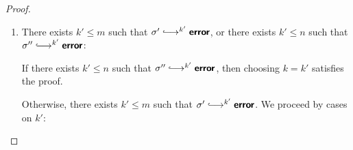 \begin{proof}
\begin{enumerate}
\begin{itemize}
      From $\conf' \parstepsto \conf'''$ and $\conf' \parstepsto^{i'}
      \conf_c'$ and Lemma~\ref{lem:strong-one-sided-quasi-confluence},
      one of the following two cases is true:
      \begin{enumerate}
        \item There exist $\conf_c''$ and $i''$ and $j''$ such that
          $\conf''' \parstepsto^{i''} \conf_c''$ and $\conf_c'
          \parstepsto^{j''} \conf_c''$ and $i'' \leq i'$ and $j'' \leq
          1$.  So we also have $\conf'' \parstepsto^{j'} \conf_c'
          \parstepsto^{j''} \conf_c''$.  In summary, we pick $\conf_c
          = \conf_c''$ and $i = i''$ and $j = j' + j''$, which is
          sufficient because $i = i'' \leq i' \leq m$ and $j = j' +
          j'' \leq n + 1$.
        \item There exists $k'' \leq i'$ such that $\conf'''
          \parstepsto^{k''} \error$, or there exists $k'' \leq 1$ such
          that $\conf'_c \parstepsto^{k''} \error$.

          If there exists $k'' \leq i'$ such that $\conf'''
          \parstepsto^{k''} \error$, then choosing $k = k''$ satisfies
          the proof, since $k'' \leq i' \leq m$.

          Otherwise, there exists $k'' \leq 1$ such
          that $\conf'_c \parstepsto^{k''} \error$.

          Therefore, $\conf'' \parstepsto^{j'} \conf_c'
          \parstepsto^{k''} \error$.

          Hence $\conf'' \parstepsto^{j' + k''} \error$.

          Since $j' \leq n$ and $k'' \leq 1$, $j' + k'' \leq n + 1$.

          Hence choosing $k = j' + k''$ satisfies the proof.

      \end{enumerate}
    \end{itemize}

  \item There exists $k' \leq m$ such that $\conf' \parstepsto^{k'}
    \error$, or there exists $k' \leq n$ such that $\conf''
    \parstepsto^{k'} \error$:

    If there exists $k' \leq n$ such that $\conf'' \parstepsto^{k'}
    \error$, then choosing $k = k'$ satisfies the proof.

    Otherwise, there exists $k' \leq m$ such that $\conf'
    \parstepsto^{k'} \error$.  We proceed by cases on $k'$:

    \begin{itemize}


\end{itemize}
\end{enumerate}
\end{proof}
